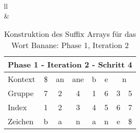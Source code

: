 \begin{table}[H]
\begin{adjustbox}{max width=\textwidth}
\begin{tabular}{ll}
\\
&
\\

\begin{tabular}{lccccccc}
\multicolumn{8}{l}{Phase 1 - Iteration 2 - Schritt 4}                                                                                                                                                                                  \\ \hline
\multicolumn{1}{l|}{Kontext} & \multicolumn{1}{c|}{\$} & \multicolumn{1}{c|}{\cellcolor[HTML]{\yellow}an} & \multicolumn{1}{c|}{\cellcolor[HTML]{\yellow}ane} & \multicolumn{1}{c|}{b} & \multicolumn{1}{c|}{e} & \multicolumn{2}{c}{n} \\
\multicolumn{1}{l|}{Gruppe}  & \multicolumn{1}{c|}{7}  & \multicolumn{1}{c|}{\cellcolor[HTML]{\yellow}2}  & \multicolumn{1}{c|}{\cellcolor[HTML]{\yellow}4}   & \multicolumn{1}{c|}{1} & \multicolumn{1}{c|}{6} & 3         & 5          \\ \hline
\multicolumn{1}{l|}{Index}   & 1                       & 2                                               & 3                                                & 4                      & 5                      & 6         & 7          \\
\multicolumn{1}{l|}{Zeichen} & b                       & a                                               & n                                                & a                      & n                      & e         & \$        
\end{tabular}

\end{tabular}
\end{adjustbox}

\caption[Konstruktion des Suffix Arrays für das Wort Banane: Phase 1, Iteration 2]{Konstruktion des Suffix Arrays für das Wort Banane: Phase 1, Iteration 2}
\label{gsaca:fig_banane_1_2} 
\end{table}
